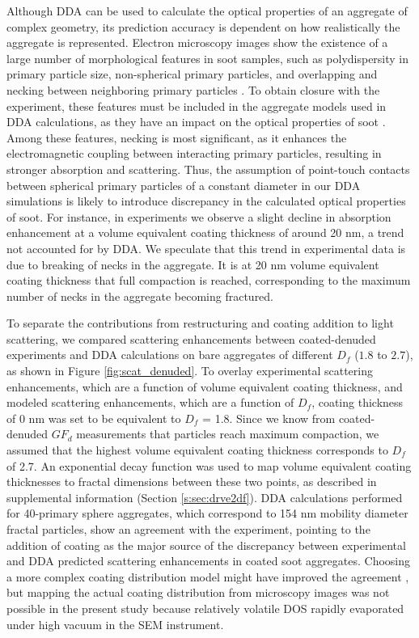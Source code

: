 Although DDA can be used to calculate the optical properties of an aggregate of complex geometry, its prediction accuracy is dependent on how realistically the aggregate is represented. Electron microscopy images show the existence of a large number of morphological features in soot samples, such as polydispersity in primary particle size, non-spherical primary particles, and overlapping and necking between neighboring primary particles \citep{RN24,RN28}. To obtain closure with the experiment, these features must be included in the aggregate models used in DDA calculations, as they have an impact on the optical properties of soot \citep{teng2019accounting}. Among these features, necking is most significant, as it enhances the electromagnetic coupling between interacting primary particles, resulting in stronger absorption and scattering. Thus, the assumption of point-touch contacts between spherical primary particles of a constant diameter in our DDA simulations is likely to introduce discrepancy in the calculated optical properties of soot. For instance, in experiments we observe a slight decline in absorption enhancement at a volume equivalent coating thickness of around 20 nm, a trend not accounted for by DDA. We speculate that this trend in experimental data is due to breaking of necks in the aggregate. It is at 20 nm volume equivalent coating thickness that full compaction is reached, corresponding to the maximum number of necks in the aggregate becoming fractured.

To separate the contributions from restructuring and coating addition to light scattering, we compared scattering enhancements between coated-denuded experiments and DDA calculations on bare aggregates of different $D_f$ ($1.8$ to $2.7$), as shown in Figure \ref{fig:scat_denuded}. To overlay experimental scattering enhancements, which are a function of volume equivalent coating thickness, and modeled scattering enhancements, which are a function of $D_f$, coating thickness of 0 nm was set to be equivalent to $D_f$ = 1.8. Since we know from coated-denuded $GF_{d}$ measurements that particles reach maximum compaction, we assumed that the highest volume equivalent coating thickness corresponds to $D_f$ of 2.7. An exponential decay function was used to map volume equivalent coating thicknesses to fractal dimensions between these two points, as described in supplemental information (Section \ref{s:sec:drve2df}). DDA calculations performed for 40-primary sphere aggregates, which correspond to 154 nm mobility diameter fractal particles, show an agreement with the experiment, pointing to the addition of coating as the major source of the discrepancy between experimental and DDA predicted scattering enhancements in coated soot aggregates. Choosing a more complex coating distribution model might have improved the agreement \citep{luo2019optical}, but mapping the actual coating distribution from microscopy images was not possible in the present study because relatively volatile DOS rapidly evaporated under high vacuum in the SEM instrument.


